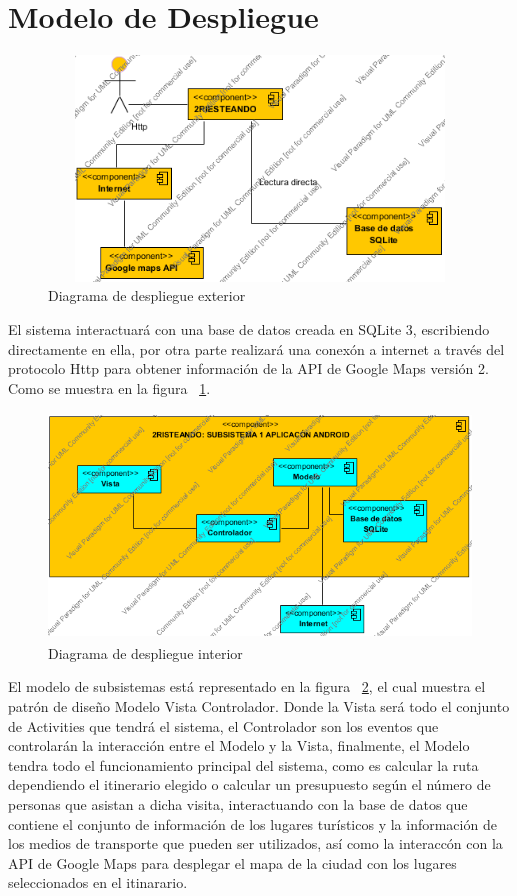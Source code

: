 \section{Modelo de Despliegue}

\begin{figure}[h]

  \centering
  \includegraphics[width=14cm,height=6cm]{Imagenes/Despliegue/Arquitectonico.png}
  \caption{Diagrama de despliegue exterior}  
  \label{fig:arqui}
\end{figure}

El sistema interactuar\'a con una base de datos creada en SQLite 3, escribiendo directamente en ella, por otra parte realizar\'a una conex\'on
a internet a trav\'es del protocolo Http para obtener informaci\'on de la API de Google Maps versi\'on 2. Como
se muestra en la figura ~\ref{fig:arqui}.


\begin{figure}[h]

  \centering
  \includegraphics[width=18cm,height=6cm]{Imagenes/Despliegue/Subsistemas.png}
  \caption{Diagrama de despliegue interior}  
  \label{fig:subsistemas}
\end{figure}

El modelo de subsistemas est\'a representado en la figura ~\ref{fig:subsistemas}, el cual muestra el patr\'on de dise\~no
Modelo Vista Controlador. Donde la Vista ser\'a todo el conjunto de Activities que tendr\'a el sistema, el Controlador son
los eventos que controlar\'an la interacci\'on entre el Modelo y la Vista, finalmente, el Modelo tendra todo el funcionamiento
principal del sistema, como es calcular la ruta dependiendo el itinerario elegido o calcular un presupuesto seg\'un el n\'umero de personas
que asistan a dicha visita, interactuando con la base de datos que contiene el conjunto de informaci\'on de los lugares tur\'isticos
y la informaci\'on de los medios de transporte que pueden ser utilizados, as\'i como la interacc\'on con la API de Google Maps
para desplegar el mapa de la ciudad con los lugares seleccionados en el itinarario.